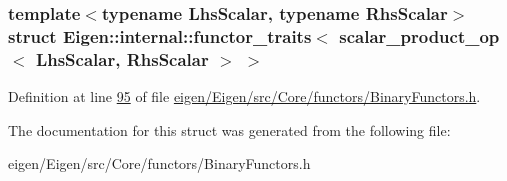 \subsubsection*{template$<$typename Lhs\+Scalar, typename Rhs\+Scalar$>$\newline
struct Eigen\+::internal\+::functor\+\_\+traits$<$ scalar\+\_\+product\+\_\+op$<$ Lhs\+Scalar, Rhs\+Scalar $>$ $>$}



Definition at line \hyperlink{eigen_2_eigen_2src_2_core_2functors_2_binary_functors_8h_source_l00095}{95} of file \hyperlink{eigen_2_eigen_2src_2_core_2functors_2_binary_functors_8h_source}{eigen/\+Eigen/src/\+Core/functors/\+Binary\+Functors.\+h}.



The documentation for this struct was generated from the following file\+:\begin{DoxyCompactItemize}
\item 
eigen/\+Eigen/src/\+Core/functors/\+Binary\+Functors.\+h\end{DoxyCompactItemize}
